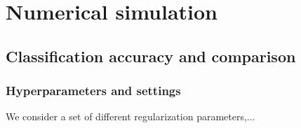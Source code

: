 \documentclass[
reprint,
aps,
pra,
floatfix,
]{revtex4-2}
\theoremstyle{plain}
\theoremstyle{definition}
\begin{document}



\section{Numerical simulation}\label{sec:numerical_simulation}


\subsection{Classification accuracy and comparison}
\subsubsection{Hyperparameters and settings}
We consider a set of different regularization parameters,...
\end{document}
